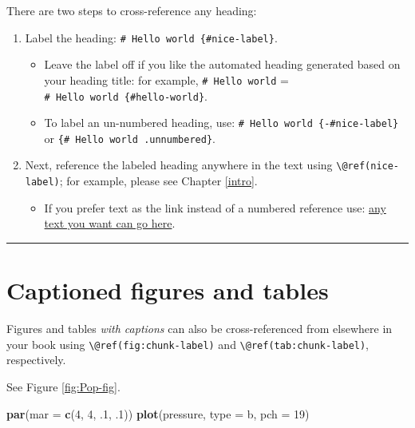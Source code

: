 \documentclass[
]{book}
\newenvironment{Shaded}{\begin{snugshade}}{\end{snugshade}}
\newcommand{\AttributeTok}[1]{\textcolor[rgb]{0.13,0.29,0.53}{#1}}
\newcommand{\DecValTok}[1]{\textcolor[rgb]{0.00,0.00,0.81}{#1}}
\newcommand{\FunctionTok}[1]{\textcolor[rgb]{0.13,0.29,0.53}{\textbf{#1}}}
\newcommand{\NormalTok}[1]{#1}
\newcommand{\StringTok}[1]{\textcolor[rgb]{0.31,0.60,0.02}{#1}}
\providecommand{\tightlist}{%
  \setlength{\itemsep}{0pt}\setlength{\parskip}{0pt}}
\theoremstyle{definition}
\theoremstyle{definition}
\theoremstyle{definition}
\theoremstyle{definition}
\theoremstyle{remark}
\begin{document}
There are two steps to cross-reference any heading:

\begin{enumerate}
\def\labelenumi{\arabic{enumi}.}
\item
  Label the heading: \texttt{\#\ Hello\ world\ \{\#nice-label\}}.

  \begin{itemize}
  \item
    Leave the label off if you like the automated heading generated based on your heading title: for example, \texttt{\#\ Hello\ world} = \texttt{\#\ Hello\ world\ \{\#hello-world\}}.
  \item
    To label an un-numbered heading, use: \texttt{\#\ Hello\ world\ \{-\#nice-label\}} or \texttt{\{\#\ Hello\ world\ .unnumbered\}}.
  \end{itemize}
\item
  Next, reference the labeled heading anywhere in the text using \texttt{\textbackslash{}@ref(nice-label)}; for example, please see Chapter \ref{intro}.

  \begin{itemize}
  \tightlist
  \item
    If you prefer text as the link instead of a numbered reference use: \hyperref[cross]{any text you want can go here}.
  \end{itemize}
\end{enumerate}

\begin{center}\rule{0.5\linewidth}{0.5pt}\end{center}

\section{Captioned figures and tables}\label{captioned-figures-and-tables}

Figures and tables \emph{with captions} can also be cross-referenced from elsewhere in your book using \texttt{\textbackslash{}@ref(fig:chunk-label)} and \texttt{\textbackslash{}@ref(tab:chunk-label)}, respectively.

See Figure \ref{fig:Pop-fig}.

\begin{Shaded}
\begin{Highlighting}[]
\FunctionTok{par}\NormalTok{(}\AttributeTok{mar =} \FunctionTok{c}\NormalTok{(}\DecValTok{4}\NormalTok{, }\DecValTok{4}\NormalTok{, .}\DecValTok{1}\NormalTok{, .}\DecValTok{1}\NormalTok{))}
\FunctionTok{plot}\NormalTok{(pressure, }\AttributeTok{type =} \StringTok{\textquotesingle{}b\textquotesingle{}}\NormalTok{, }\AttributeTok{pch =} \DecValTok{19}\NormalTok{)}
\end{Highlighting}
\end{Shaded}
\end{document}
